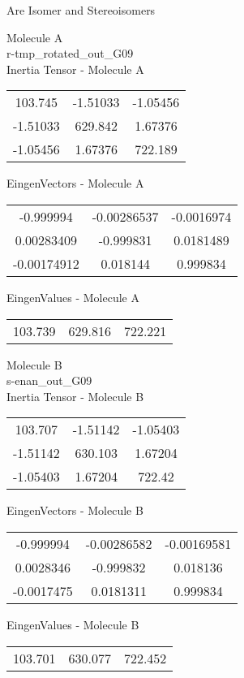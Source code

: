 \begin{center}
\vtab
\vtab
\textcolor{NavyBlue}{\Large Are Isomer and Stereoisomers}
\end{center}
\newpage
\begin{multicols}{2}
\begin{center}
Molecule A \\ 
r-tmp\_rotated\_out\_G09
\\
Inertia Tensor - Molecule A \\
\vtab
\begin{tabular}{|c c c|}
103.745	 & 	-1.51033	 & 	-1.05456	 \\
-1.51033	 & 	629.842	 & 	1.67376	 \\
-1.05456	 & 	1.67376	 & 	722.189
\end{tabular}

\vtab
 EingenVectors - Molecule A     \\
\vtab
\begin{tabular}{|c c c|}
-0.999994	 & 	-0.00286537	 & 	-0.0016974	 \\
0.00283409	 & 	-0.999831	 & 	0.0181489	 \\
-0.00174912	 & 	0.018144	 & 	0.999834
\end{tabular}

\vtab
 EingenValues - Molecule A     \\
\vtab
\begin{tabular}{|c c c|}
103.739	 & 	629.816	 & 	722.221
\end{tabular}
\columnbreak

Molecule B \\ 
s-enan\_out\_G09
\\
Inertia Tensor - Molecule B \\
\vtab
\begin{tabular}{|c c c|}
103.707	 & 	-1.51142	 & 	-1.05403	 \\
-1.51142	 & 	630.103	 & 	1.67204	 \\
-1.05403	 & 	1.67204	 & 	722.42
\end{tabular}

\vtab
 EingenVectors - Molecule B     \\
\vtab
\begin{tabular}{|c c c|}
-0.999994	 & 	-0.00286582	 & 	-0.00169581	 \\
0.0028346	 & 	-0.999832	 & 	0.018136	 \\
-0.0017475	 & 	0.0181311	 & 	0.999834
\end{tabular}

\vtab
 EingenValues - Molecule B     \\
\vtab
\begin{tabular}{|c c c|}
103.701	 & 	630.077	 & 	722.452
\end{tabular}

\end{center}
\end{multicols}
